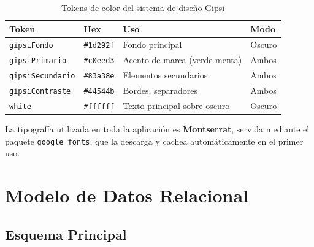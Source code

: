 \documentclass[12pt,a4paper,twoside]{report}
\begin{document}
\begin{table}[H]
\centering
\caption{Tokens de color del sistema de diseño Gipsi}
\label{tab:colores}
\begin{tabular}{llll}
\toprule
Token & Hex & Uso & Modo \\
\midrule
\texttt{gipsiFondo} & \texttt{\#1d292f} & Fondo principal & Oscuro \\
\texttt{gipsiPrimario} & \texttt{\#c0eed3} & Acento de marca (verde menta) & Ambos \\
\texttt{gipsiSecundario} & \texttt{\#83a38e} & Elementos secundarios & Ambos \\
\texttt{gipsiContraste} & \texttt{\#44544b} & Bordes, separadores & Ambos \\
\texttt{white} & \texttt{\#ffffff} & Texto principal sobre oscuro & Oscuro \\
\bottomrule
\end{tabular}
\end{table}

La tipografía utilizada en toda la aplicación es \textbf{Montserrat}, servida mediante el paquete \texttt{google\_fonts}, que la descarga y cachea automáticamente en el primer uso.

\section{Modelo de Datos Relacional}

\subsection{Esquema Principal}
\end{document}
